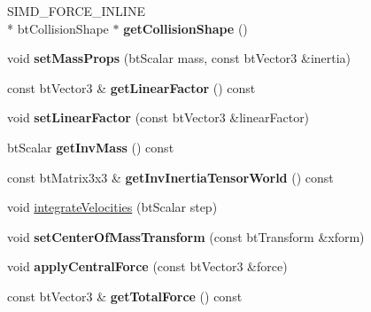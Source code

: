 \begin{DoxyCompactItemize}
\item 
\hypertarget{classbt_rigid_body_a4c79924fbf05ebb79859758b650841b8}{S\+I\+M\+D\+\_\+\+F\+O\+R\+C\+E\+\_\+\+I\+N\+L\+I\+N\+E \\*
bt\+Collision\+Shape $\ast$ {\bfseries get\+Collision\+Shape} ()}\label{classbt_rigid_body_a4c79924fbf05ebb79859758b650841b8}

\item 
\hypertarget{classbt_rigid_body_a912b4a273bcd6fe9af25c47106db900c}{void {\bfseries set\+Mass\+Props} (bt\+Scalar mass, const bt\+Vector3 \&inertia)}\label{classbt_rigid_body_a912b4a273bcd6fe9af25c47106db900c}

\item 
\hypertarget{classbt_rigid_body_ae7b3f0f0df8a9e24f75f632ca08540cb}{const bt\+Vector3 \& {\bfseries get\+Linear\+Factor} () const }\label{classbt_rigid_body_ae7b3f0f0df8a9e24f75f632ca08540cb}

\item 
\hypertarget{classbt_rigid_body_a00cf3fa28987ffb77764e5bd3605e3ef}{void {\bfseries set\+Linear\+Factor} (const bt\+Vector3 \&linear\+Factor)}\label{classbt_rigid_body_a00cf3fa28987ffb77764e5bd3605e3ef}

\item 
\hypertarget{classbt_rigid_body_aff8193d59d882da6de7236b2410d7e52}{bt\+Scalar {\bfseries get\+Inv\+Mass} () const }\label{classbt_rigid_body_aff8193d59d882da6de7236b2410d7e52}

\item 
\hypertarget{classbt_rigid_body_aac3284d52f4dd4628a0e0ffbc6e05908}{const bt\+Matrix3x3 \& {\bfseries get\+Inv\+Inertia\+Tensor\+World} () const }\label{classbt_rigid_body_aac3284d52f4dd4628a0e0ffbc6e05908}

\item 
void \hyperlink{classbt_rigid_body_a16029bc5aabcbb33aaf7e6e6e819283a}{integrate\+Velocities} (bt\+Scalar step)
\item 
\hypertarget{classbt_rigid_body_adeaff2386513eeaaa138e0e3b3acca66}{void {\bfseries set\+Center\+Of\+Mass\+Transform} (const bt\+Transform \&xform)}\label{classbt_rigid_body_adeaff2386513eeaaa138e0e3b3acca66}

\item 
\hypertarget{classbt_rigid_body_a48478896407083f4ff64299e0c3c4a32}{void {\bfseries apply\+Central\+Force} (const bt\+Vector3 \&force)}\label{classbt_rigid_body_a48478896407083f4ff64299e0c3c4a32}

\item 
\hypertarget{classbt_rigid_body_adbd5a6aaa82496ec9eadcb386b9fb07d}{const bt\+Vector3 \& {\bfseries get\+Total\+Force} () const }\label{classbt_rigid_body_adbd5a6aaa82496ec9eadcb386b9fb07d}


\end{DoxyCompactItemize}
